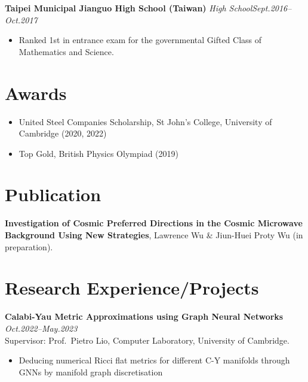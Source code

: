 \documentclass[11pt,a4paper,roman]{moderncv}        %
\begin{document}
\textbf{Taipei Municipal Jianguo High School (Taiwan)} \textit{High School}\hfill \textit{Sept.2016--Oct.2017}
\vspace*{1mm}
\begin{itemize}
\item{Ranked 1st in entrance exam for the governmental Gifted Class of Mathematics and Science.}
\end{itemize}

\section{Awards}
\begin{itemize}
	\item United Steel Companies Scholarship, St John's College, University of Cambridge (2020, 2022)
	\item Top Gold, British Physics Olympiad (2019)
\end{itemize}


\section{Publication}
\textbf{Investigation of Cosmic Preferred Directions in the Cosmic Microwave Background Using New Strategies}, Lawrence Wu \& Jiun-Huei Proty Wu (in preparation).

\section{Research Experience/Projects}

\textbf{Calabi-Yau Metric Approximations using Graph Neural Networks} \hfill \textit{Oct.2022--May.2023}
\vspace*{1mm}\\
{Supervisor: Prof.\ Pietro Lio, Computer Laboratory, University of Cambridge.}
\vspace*{1mm}
\begin{itemize}
	\item Deducing numerical Ricci flat metrics for different C-Y manifolds through GNNs by manifold graph discretisation\\
\end{itemize}
\end{document}
